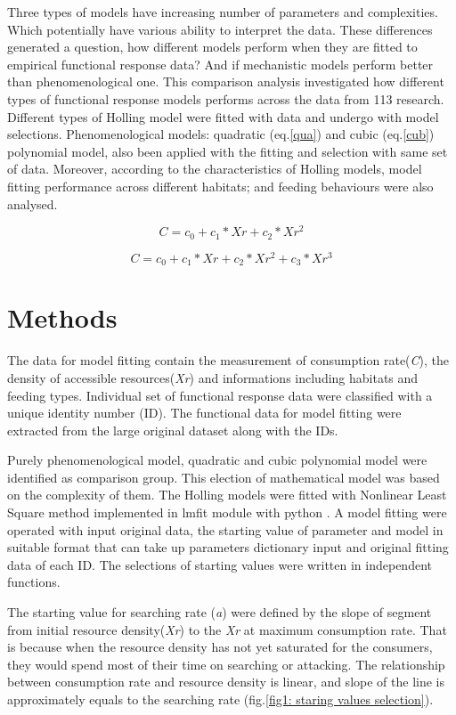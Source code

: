 \documentclass[11pt, a4paper]{article}
\begin{document}
Three types of models have increasing number of parameters and complexities. Which potentially have various ability to interpret the data. These differences generated a question, how different models perform when they are fitted to empirical functional response data? And if mechanistic models perform better than phenomenological one. This comparison analysis investigated how different types of functional response models performs across the data from 113 research. Different types of Holling model were fitted with data and undergo with model selections. Phenomenological models: quadratic (eq.\ref{qua}) and cubic (eq.\ref{cub}) polynomial model, also been applied with the fitting and selection with same set of data. Moreover, according to the characteristics of Holling models, model fitting performance across different habitats; and feeding behaviours were also analysed.

\begin{equation}\label{qua}
C = c_{0}+c_{1}*Xr+c_{2}*Xr^{2}
\end{equation}

\begin{equation}\label{cub}
C = c_{0}+c_{1}*Xr+c_{2}*Xr^{2}+c_{3}*Xr^{3}
\end{equation}

 
 
\section{Methods}
The data for model fitting contain the measurement of consumption rate(\textit{C}), the density of accessible resources(\textit{Xr}) and informations including habitats and feeding types. Individual set of functional response data were classified with a unique identity number (ID). The functional data for model fitting were extracted from the large original dataset along with the IDs. 

Purely phenomenological model, quadratic and cubic polynomial model were identified as comparison group. This election of mathematical model was based on the complexity of them. 
The Holling models were fitted with Nonlinear Least Square method implemented in  lmfit module with python \cite{lmfit}. A model fitting were operated with input original data, the starting value of parameter and model in suitable format that can take up parameters dictionary input and original fitting data of each ID. The selections of starting values were written in independent functions. 

The starting value for searching rate (\textit{a}) were defined by the slope of segment from initial resource density(\textit{Xr}) to the \textit{Xr} at maximum consumption rate. That is because when the resource density has not yet saturated for the consumers, they would spend most of their time on searching or attacking. The relationship between consumption rate and resource density is linear, and slope of  the line is approximately equals to the searching rate (fig.\ref{fig1: staring values selection}). 
\end{document}
